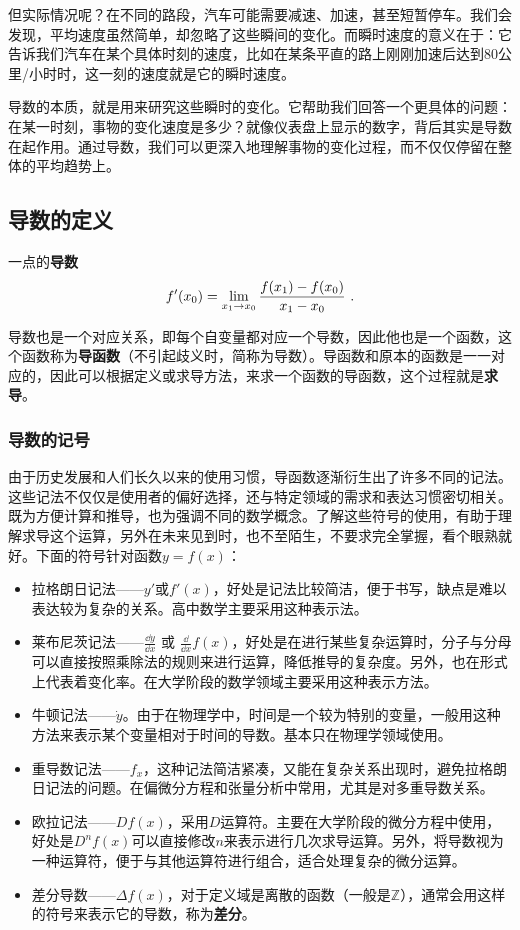 但实际情况呢？在不同的路段，汽车可能需要减速、加速，甚至短暂停车。我们会发现，平均速度虽然简单，却忽略了这些瞬间的变化。而瞬时速度的意义在于：它告诉我们汽车在某个具体时刻的速度，比如在某条平直的路上刚刚加速后达到80公里/小时时，这一刻的速度就是它的瞬时速度。

导数的本质，就是用来研究这些瞬时的变化。它帮助我们回答一个更具体的问题：在某一时刻，事物的变化速度是多少？就像仪表盘上显示的数字，背后其实是导数在起作用。通过导数，我们可以更深入地理解事物的变化过程，而不仅仅停留在整体的平均趋势上。

\subsection{导数的定义}
一点的\textbf{导数}
\begin{equation}
f'(x_0)=\lim_{x_1\to x_0}{f(x_1)-f(x_0)\over x_1-x_0}~.
\end{equation}

导数也是一个对应关系，即每个自变量都对应一个导数，因此他也是一个函数，这个函数称为\textbf{导函数}（不引起歧义时，简称为导数）。导函数和原本的函数是一一对应的，因此可以根据定义或求导方法，来求一个函数的导函数，这个过程就是\textbf{求导}。

\subsubsection{导数的记号}
由于历史发展和人们长久以来的使用习惯，导函数逐渐衍生出了许多不同的记法。这些记法不仅仅是使用者的偏好选择，还与特定领域的需求和表达习惯密切相关。既为方便计算和推导，也为强调不同的数学概念。了解这些符号的使用，有助于理解求导这个运算，另外在未来见到时，也不至陌生，不要求完全掌握，看个眼熟就好。下面的符号针对函数$y=f(x)$：
\begin{itemize}
\item 拉格朗日记法——$y'$或$f'(x)$，好处是记法比较简洁，便于书写，缺点是难以表达较为复杂的关系。高中数学主要采用这种表示法。
\item 莱布尼茨记法——$\displaystyle\frac{\dd y}{\dd x}$  或  $\displaystyle\frac{\dd}{\dd x}f(x)$，好处是在进行某些复杂运算时，分子与分母可以直接按照乘除法的规则来进行运算，降低推导的复杂度。另外，也在形式上代表着变化率。在大学阶段的数学领域主要采用这种表示方法。
\item 牛顿记法——$\dot{y}$。由于在物理学中，时间是一个较为特别的变量，一般用这种方法来表示某个变量相对于时间的导数。基本只在物理学领域使用。
\item 重导数记法——$f_x$，这种记法简洁紧凑，又能在复杂关系出现时，避免拉格朗日记法的问题。在偏微分方程和张量分析中常用，尤其是对多重导数关系。
\item 欧拉记法——$Df(x)$，采用$D$运算符。主要在大学阶段的微分方程中使用，好处是$D^n f(x)$可以直接修改$n$来表示进行几次求导运算。另外，将导数视为一种运算符，便于与其他运算符进行组合，适合处理复杂的微分运算。
\item 差分导数——$\Delta f(x)$，对于定义域是离散的函数（一般是$\mathbb{Z}$），通常会用这样的符号来表示它的导数，称为\textbf{差分}。
\end{itemize}

